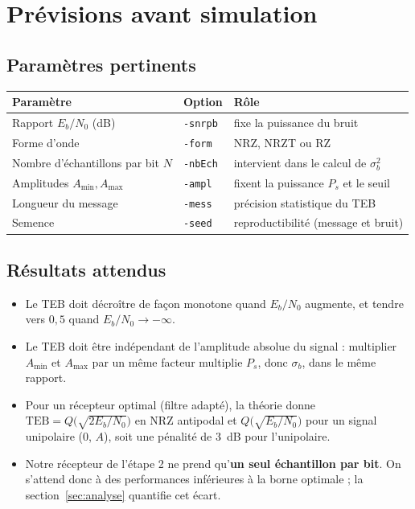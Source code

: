 \documentclass[11pt,a4paper]{article}
\newcommand{\EbNo}{E_b/N_0}
\begin{document}
\section{Prévisions avant simulation}
\subsection{Paramètres pertinents}
\begin{center}\begin{tabular}{lll}\toprule
Paramètre & Option & Rôle\\\midrule
Rapport $\EbNo$ (dB) & \texttt{-snrpb} & fixe la puissance du bruit\\
Forme d'onde & \texttt{-form} & NRZ, NRZT ou RZ\\
Nombre d'échantillons par bit $N$ & \texttt{-nbEch} & intervient dans le calcul de $\sigma_b^2$\\
Amplitudes $A_{\min}, A_{\max}$ & \texttt{-ampl} & fixent la puissance $P_s$ et le seuil\\
Longueur du message & \texttt{-mess} & précision statistique du TEB\\
Semence & \texttt{-seed} & reproductibilité (message et bruit)\\\bottomrule
\end{tabular}\end{center}

\subsection{Résultats attendus}
\begin{itemize}
  \item Le TEB doit décroître de façon monotone quand $\EbNo$ augmente, et tendre vers $0{,}5$ quand $\EbNo\to-\infty$.
  \item Le TEB doit être indépendant de l'amplitude absolue du signal : multiplier $A_{\min}$ et $A_{\max}$ par un même facteur multiplie $P_s$, donc $\sigma_b$, dans le même rapport.
  \item Pour un récepteur optimal (filtre adapté), la théorie donne $\text{TEB} = Q\big(\sqrt{2\EbNo}\big)$ en NRZ antipodal et $Q\big(\sqrt{\EbNo}\big)$ pour un signal unipolaire (0, $A$), soit une pénalité de 3~dB pour l'unipolaire.
  \item Notre récepteur de l'étape 2 ne prend qu'\textbf{un seul échantillon par bit}. On s'attend donc à des performances inférieures à la borne optimale ; la section~\ref{sec:analyse} quantifie cet écart.
\end{itemize}
\end{document}
